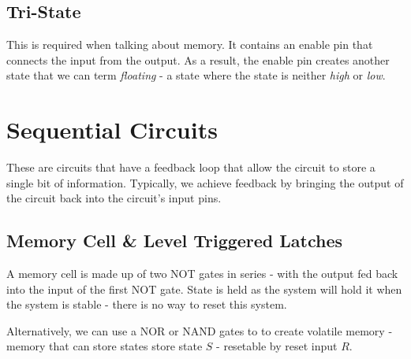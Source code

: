 \documentclass[]{report}
\begin{document}
\subsection{Tri-State}
This is required when talking about memory. It contains an enable pin that connects the input from the output. As a result, the enable pin creates another state that we can term \emph{floating} - a state where the state is neither \emph{high} or \emph{low}. 

\section{Sequential Circuits}
These are circuits that have a feedback loop that allow the circuit to store a single bit of information. Typically, we achieve feedback by bringing the output of the circuit back into the circuit's input pins. 

\subsection{Memory Cell \& Level Triggered Latches}
A memory cell is made up of two NOT gates in series - with the output fed back into the input of the first NOT gate. State is held as the system will hold it when the system is stable - there is no way to reset this system. 

Alternatively, we can use a NOR or NAND gates to to create volatile memory - memory that can store states store state $S$ - resetable by reset input $R$. 
\end{document}
